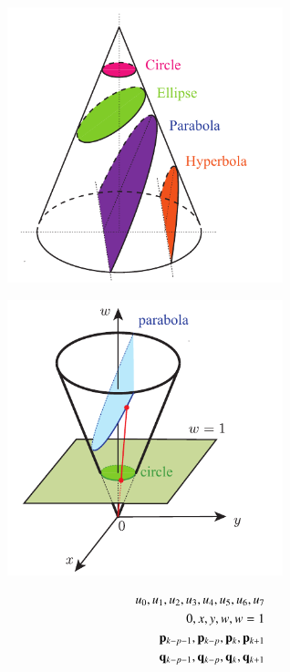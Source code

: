 \begin{figure}[htbp!]
\center
\includegraphics[width=80mm]{images/cone.pdf}
\end{figure}






\begin{figure}[htbp!]
\center
\includegraphics[width=80mm]{images/parabola.pdf}
\end{figure}



\begin{eqnarray}
u_0,u_1,u_2,u_3,u_4,u_5,u_6,u_7\\
0,x,y,w,w=1\\
\mathbf{p}_{k-p-1},\mathbf{p}_{k-p},\mathbf{p}_{k},\mathbf{p}_{k+1}\\
\mathbf{q}_{k-p-1},\mathbf{q}_{k-p},\mathbf{q}_{k},\mathbf{q}_{k+1}
\end{eqnarray}







